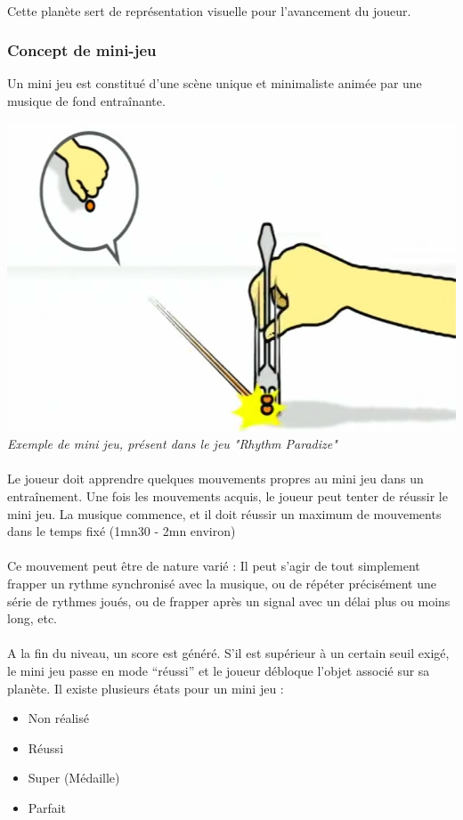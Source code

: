 \paragraph{}Cette planète sert de représentation visuelle pour l’avancement du joueur.

\subsubsection{Concept de mini-jeu}
Un mini jeu est constitué d’une scène unique et minimaliste animée par une musique de fond entraînante.
\begin{center}
\includegraphics[scale=0.4]{img/rhythmParadise.png}\\
\textit{Exemple de mini jeu, présent dans le jeu "Rhythm Paradize"}
\end{center}
\paragraph{} Le joueur doit apprendre quelques mouvements propres au mini jeu dans un entraînement. Une fois les mouvements acquis, le joueur peut tenter de réussir le mini jeu. La musique commence, et il doit réussir un maximum de mouvements dans le temps fixé (1mn30 - 2mn environ)
\paragraph{} Ce mouvement peut être de nature varié : Il peut s’agir de tout simplement frapper un rythme synchronisé avec la musique, ou de répéter précisément une série de rythmes joués, ou de frapper après un signal avec un délai plus ou moins long, etc.
\paragraph{} A la fin du niveau, un score est généré. S’il est supérieur à un certain seuil exigé, le mini jeu passe en mode “réussi” et le joueur débloque l’objet associé sur sa planète.
Il existe plusieurs états pour un mini jeu :
\begin{itemize}
\item Non réalisé
\item Réussi
\item Super (Médaille)
\item Parfait
\end{itemize}
